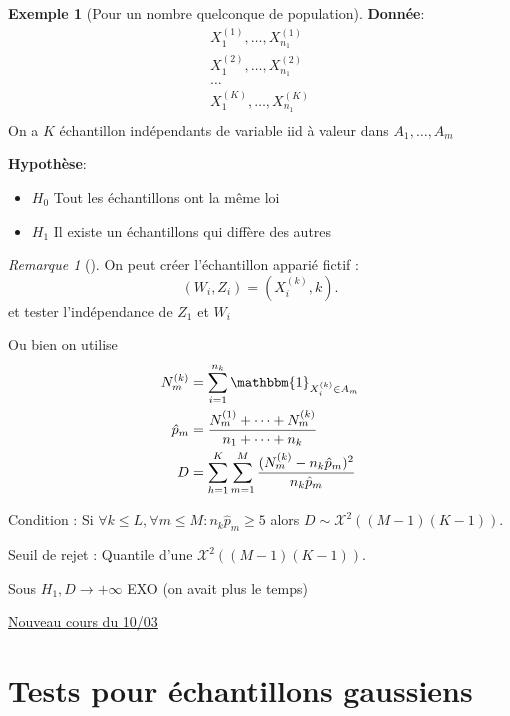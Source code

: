 \documentclass{article}
\theoremstyle{plain}%
\theoremstyle{definition}
\newtheorem{exmp}{Exemple}[section]
\theoremstyle{remark}
\newtheorem*{rem}{Remarque}
\begin{document}
\begin{exmp}[Pour un nombre quelconque de population]
    \textbf{Donnée}: \begin{align*}
        X_1^{(1)}, \dots, X_{n_1}^{(1)} \\
        X_1^{(2)}, \dots, X_{n_1}^{(2)} \\
        \dots  \\
        X_1^{(K)}, \dots, X_{n_1}^{(K)} \\
    \end{align*}
    On a $ K $ échantillon indépendants de variable iid à valeur dans $ A_1, \dots, A_m $ 

    \textbf{Hypothèse}: \begin{itemize}
        \item $ H_0 $ Tout les échantillons ont la même loi
        \item $ H_1 $ Il existe un échantillons qui diffère des autres
    \end{itemize}

    \begin{rem}[]
        On peut créer l'échantillon apparié fictif :
        \[
            (W_i, Z_i) = (X_i^{(k)}, k)
        .\]
        et tester l'indépendance de $ Z_1 $ et $ W_i $  
    \end{rem}
    
    Ou bien on utilise 
    \begin{align*}
        N_m^{(k)} &= \sum_{i=1}^{n_k} \mathbbm{1}_{X_i^{(k)} \in A_m} \\
        \hat{p}_m &= \frac{N_m^{(1)} + \dots + N_m^{(k)}}{n_1 + \dots + n_k} \\
        D &= \sum_{h=1}^{K}\sum_{m=1}^{M} \frac{ (N_m ^{(k)} - n_k \hat{p}_m)^2 }{n_k \hat{p}_m}
    \end{align*}
    
    Condition : Si $ \forall k \leq L, \forall m \leq M : n_k \hat{p}_m \geq 5 $ alors $ D \sim \mathcal{X}^2 ((M-1)(K-1)) $. 

    Seuil de rejet : Quantile d'une $ \mathcal{X}^2 ( (M-1) (K-1) ) $. 

    Sous $ H_1, D \to + \infty  $ EXO (on avait plus le temps)
\end{exmp}

\underline{Nouveau cours du 10/03} \\

\section{Tests pour échantillons gaussiens}
\end{document}
